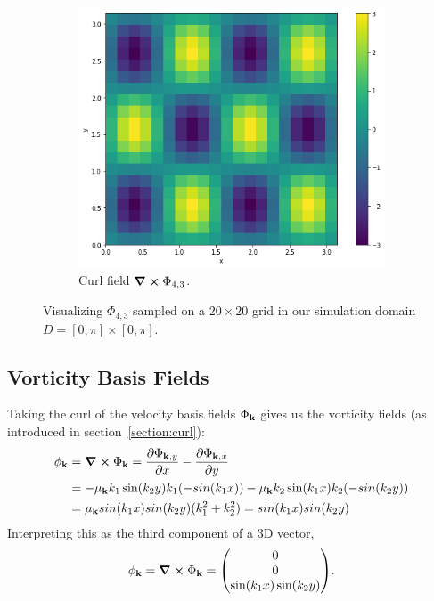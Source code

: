 \begin{figure}
\begin{subfigure}[t]{0.48\textwidth}
    \includegraphics[height=\textwidth]{figures/eigenfluids/k_4_3_curl_bar.png}
    \caption{Curl field $\curl{\Phi_{4,3}}$.}
  \end{subfigure}\par\medskip
  \caption{Visualizing $\Phi_{4,3}$ sampled on a $20 \times 20$ grid in
  our simulation domain $D = [0,\pi] \times [0,\pi]$.}
  \label{fig:phi-example}
\end{figure}

\subsection*{Vorticity Basis Fields}
Taking the curl of the velocity basis fields $\Phi_{\vb{k}}$ gives us the
vorticity fields (as introduced in section~\ref{section:curl}):
\begin{align*}
    \phi_{\vb{k}} &= \curl{\Phi_{\vb{k}}} 
    =  \pdv{\Phi_{\vb{k},y}}{x} - \pdv{\Phi_{\vb{k},x}}{y}\\
&= -\mu_{\vb{k}} k_1 \sin(k_2 y) k_1(-sin(k_1 x)) - \mu_{\vb{k}} k_2 \sin(k_1 x)
    k_2 (-sin(k_2 y))\\
&= \mu_{\vb{k}} sin(k_1 x) sin(k_2 y)(k_1^2+k_2^2) = sin(k_1 x) sin(k_2 y)
\end{align*}
Interpreting this as the third component of a 3D vector,
$$\phi_{\vb{k}} = \curl{\Phi_{\vb{k}}} 
= \mqty(0 \\ 0 \\ \sin(k_1 x) \sin(k_2 y)).$$

